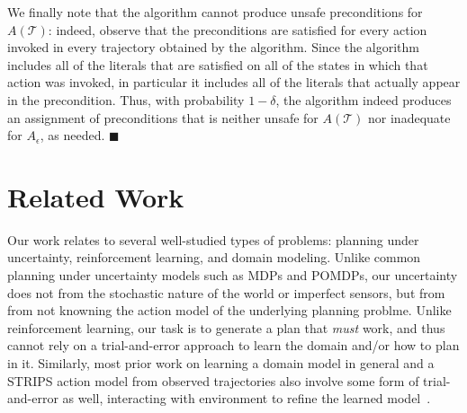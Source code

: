 \documentclass[letterpaper]{article}
\newenvironment{proof}{\noindent{\bf Proof:~~}}{\qed}
\newcommand{\qed}{\hfill\ensuremath{\blacksquare}}
\begin{document}
\begin{proof}

We finally note that the algorithm cannot produce unsafe preconditions for $A(\mathcal{T})$: indeed, observe that the preconditions are satisfied for every action invoked in every trajectory obtained by the algorithm. Since the algorithm includes all of the literals that are satisfied on all of the states in which that action was invoked, in particular it includes all of the literals that actually appear in the precondition. Thus, with probability $1-\delta$, the algorithm indeed produces an assignment of preconditions that is neither unsafe for $A(\mathcal{T})$ nor inadequate for $A_\epsilon$, as needed.
\end{proof}


\section{Related Work}

Our work relates to several well-studied types of problems: planning under uncertainty, reinforcement learning, and domain modeling. 
Unlike common planning under uncertainty models such as MDPs and POMDPs, our uncertainty does not 
from the stochastic nature of the world or imperfect sensors, but from from not knowning the action model of the underlying planning problme. Unlike reinforcement learning, our task is to generate a plan that {\em must} work, and thus cannot rely on a trial-and-error approach to learn the domain and/or how to plan in it. 
Similarly, most prior work on learning a domain model in general and a STRIPS action model from observed trajectories also involve some form of trial-and-error as well, interacting with environment to refine the learned model~\cite{mourao2012learning,wang1994learning,wang1994learning,walsh2008efficientLearning,levine2006explanation,jimenez2013integrating}. 
\end{document}
